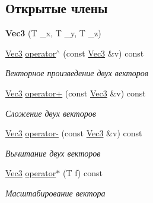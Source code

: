 \subsection*{Открытые члены}
\begin{DoxyCompactItemize}
\item 
\mbox{\label{structVec3_ab5e07fff614504292d74e3d7f29fe6f9}} 
{\bfseries Vec3} (T \+\_\+x, T \+\_\+y, T \+\_\+z)
\item 
\mbox{\label{structVec3_abd0f82b0379abee8cea2a2158f3180f1}} 
\hyperlink{structVec3}{Vec3} \hyperlink{structVec3_abd0f82b0379abee8cea2a2158f3180f1}{operator$^\wedge$} (const \hyperlink{structVec3}{Vec3} \&v) const
\begin{DoxyCompactList}\small\item\em Векторное произведение двух векторов \end{DoxyCompactList}\item 
\mbox{\label{structVec3_ab4c15073725c9533bab9949d683de7fa}} 
\hyperlink{structVec3}{Vec3} \hyperlink{structVec3_ab4c15073725c9533bab9949d683de7fa}{operator+} (const \hyperlink{structVec3}{Vec3} \&v) const
\begin{DoxyCompactList}\small\item\em Сложение двух векторов \end{DoxyCompactList}\item 
\mbox{\label{structVec3_a2d5c95b3111fb791acc763d3fcb9ebec}} 
\hyperlink{structVec3}{Vec3} \hyperlink{structVec3_a2d5c95b3111fb791acc763d3fcb9ebec}{operator-\/} (const \hyperlink{structVec3}{Vec3} \&v) const
\begin{DoxyCompactList}\small\item\em Вычитание двух векторов \end{DoxyCompactList}\item 
\mbox{\label{structVec3_a19d8367ca7b06fd84c1d71c36ea798d1}} 
\hyperlink{structVec3}{Vec3} \hyperlink{structVec3_a19d8367ca7b06fd84c1d71c36ea798d1}{operator$\ast$} (T f) const
\begin{DoxyCompactList}\small\item\em Масштабирование вектора \end{DoxyCompactList}\item 
\mbox{\label{structVec3_a95f0f9e61705b0985ebb9a428c2b89fc}} 

\end{DoxyCompactItemize}
